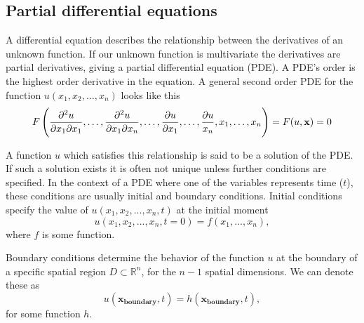 \documentclass{article}
\theoremstyle{definition}
\begin{document}
\subsection{Partial differential equations}
A differential equation describes the relationship between the derivatives of an unknown function. If our unknown function is multivariate the derivatives are partial derivatives, giving a partial differential equation (PDE).
A PDE's order is the highest order derivative in the equation. A general second order PDE for the function $u(x_1, x_2, \ldots, x_n)$ looks like this
\begin{equation}
    F\left( \frac{\partial^2 u}{\partial x_1 \partial x_1 }, \ldots, \frac{\partial^2 u}{\partial x_1 \partial x_n}, \ldots, \frac{\partial u}{\partial x_1}, \ldots, \frac{\partial u}{x_n}, x_1, \ldots, x_n\right)   = F(u, \mathbf{x}) = 0  \label{eq:general_pde}\\
\end{equation}

A function $u$ which satisfies this relationship is said to be a solution of the PDE. If such a solution exists it is often not unique unless further conditions are specified. In the context of a PDE where one of the variables represents time ($t$), these conditions are usually initial and boundary conditions. Initial conditions specify the value of $u(x_1 ,x_2, ..., x_n, t)$ at the initial moment 
\begin{equation*}
    u(x_1, x_2, ..., x_n, t=0) = f(x_1, ..., x_n),
\end{equation*}
where $f$ is some function.

Boundary conditions determine the behavior of the function $u$ at the boundary of a specific spatial region $D \subset \mathbb{R}^{n}$, for the $n-1$ spatial dimensions. We can denote these as
\begin{equation*}
    u(\boldsymbol{x_{\text{boundary}}}, t) = h(\boldsymbol{x_{\text{boundary}}}, t),
\end{equation*}
for some function $h$.
\end{document}
